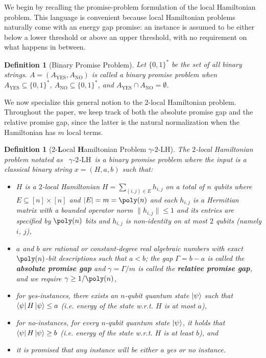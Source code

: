 \documentclass[a4paper,onecolumn,11pt]{quantumarticle}
\theoremstyle{plain}
\newtheorem{definition}[theorem]{Definition}
\newcommand{\kLH}{$\gamma$-$2$-$\mathrm{LH}$}
\begin{document}
We begin by recalling the promise-problem formulation of the local Hamiltonian problem.  This language is convenient because local Hamiltonian problems naturally come with an energy gap promise: an instance is assumed to be either below a lower threshold or above an upper threshold, with no requirement on what happens in between.

\begin{definition}[Binary Promise Problem]
Let $\{0, 1\}^*$ be the set of all binary strings. $A = \left(A_{\mathrm{YES}}, A_{\mathrm{NO}}\right)$ is called a binary promise problem when $A_{\mathrm{YES}} \subseteq \{0, 1\}^*$, $A_{\mathrm{NO}} \subseteq \{0, 1\}^*$, and $A_{\mathrm{YES}} \cap A_{\mathrm{NO}} = \emptyset$.
\end{definition}

We now specialize this general notion to the $2$-local Hamiltonian problem.  Throughout the paper, we keep track of both the absolute promise gap and the relative promise gap, since the latter is the natural normalization when the Hamiltonian has $m$ local terms.

\begin{definition}[$2$-\textbf{L}ocal \textbf{H}amiltonian Problem \kLH]
\label{defn:k-LH}
The $2$-local Hamiltonian problem notated as \ \kLH\ is a binary promise problem where the input is a classical binary string $x = (H, a, b)$ such that:
\begin{itemize}
    \item $H$ is a $2$-local Hamiltonian $H = \sum\limits_{(i, j) \in E} h_{i, j}$ on a total of $n$ qubits where $E \subseteq [n] \times [n]$ and $|E| = m = \poly(n)$ and each $h_{i,j}$ is a Hermitian matrix with a bounded operator norm $\|h_{i,j}\| \leq 1$ and its entries are specified by $\poly(n)$ bits and $h_{i,j}$ is non-identity on at most $2$ qubits (namely $i$, $j$),
    \item $a$ and $b$ are rational or constant-degree real algebraic numbers with exact $\poly(n)$-bit descriptions such that $a < b$; the gap $\Gamma = b - a$ is called the \textbf{absolute promise gap} and $\gamma = \Gamma / m$ is called the \textbf{relative promise gap}, and we require $\gamma \geq 1/\poly(n)$,
    \item for yes-instances, there exists an $n$-qubit quantum state $\ket{\psi}$ such that $\bra{\psi}H\ket{\psi} \leq a$ (i.e. energy of the state w.r.t. $H$ is at most $a$),
    \item for no-instances, for every $n$-qubit quantum state $\ket{\psi}$, it holds that $\bra{\psi}H\ket{\psi} \geq b$ (i.e. energy of the state w.r.t. $H$ is at least $b$), and
    \item it is promised that any instance will be either a yes or no instance.
\end{itemize}
\end{definition}
\end{document}
